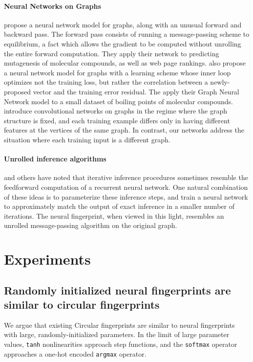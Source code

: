 \documentclass{article}
\begin{document}
\paragraph{Neural Networks on Graphs}
\cite{graphnn2009} propose a neural network model for graphs, along with an unusual forward and backward pass.
The forward pass consists of running a message-passing scheme to equilibrium, a fact which allows the gradient to be computed without unrolling the entire forward computation.
They apply their network to predicting mutagenesis of molecular compounds, as well as web page rankings.
\cite{micheli2009neural} also propose a neural network model for graphs with a learning scheme whose inner loop optimizes not the training loss, but rather the correlation between a newly-proposed vector and the training error residual.
The apply their Graph Neural Network model to a small dataset of boiling points of molecular compounds.
\cite{bruna2013spectral} introduce convolutional networks on graphs in the regime where the graph structure is fixed, and each training example differs only in having different features at the vertices of the same graph.
In contrast, our networks address the situation where each training input is a different graph.

\paragraph{Unrolled inference algorithms}
\citet{hershey2014deep} and others have noted that iterative inference procedures sometimes resemble the feedforward computation of a recurrent neural network.
One natural combination of these ideas is to parameterize these inference steps, and train a neural network to approximately match the output of exact inference in a smaller number of iterations.
The neural fingerprint, when viewed in this light, resembles an unrolled message-passing algorithm on the original graph.


\section{Experiments}

\subsection{Randomly initialized neural fingerprints are similar to circular fingerprints}
\label{sec:random is equivalent}

We argue that existing Circular fingerprints are similar to neural fingerprints with large, randomly-initialized parameters.
In the limit of large parameter values, \texttt{tanh} nonlinearities approach step functions, and the \texttt{softmax} operator approaches a one-hot encoded \texttt{argmax} operator.
\end{document}
